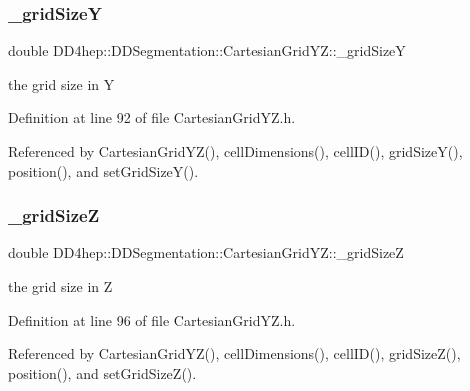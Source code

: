 \subsubsection{\texorpdfstring{\+\_\+grid\+SizeY}{\_gridSizeY}}
{\footnotesize\ttfamily double D\+D4hep\+::\+D\+D\+Segmentation\+::\+Cartesian\+Grid\+Y\+Z\+::\+\_\+grid\+SizeY\hspace{0.3cm}{\ttfamily [protected]}}



the grid size in Y 



Definition at line 92 of file Cartesian\+Grid\+Y\+Z.\+h.



Referenced by Cartesian\+Grid\+Y\+Z(), cell\+Dimensions(), cell\+I\+D(), grid\+Size\+Y(), position(), and set\+Grid\+Size\+Y().

\hypertarget{class_d_d4hep_1_1_d_d_segmentation_1_1_cartesian_grid_y_z_a4584ea29126b00ef60c8a75eeda06028}{}\label{class_d_d4hep_1_1_d_d_segmentation_1_1_cartesian_grid_y_z_a4584ea29126b00ef60c8a75eeda06028} 
\subsubsection{\texorpdfstring{\+\_\+grid\+SizeZ}{\_gridSizeZ}}
{\footnotesize\ttfamily double D\+D4hep\+::\+D\+D\+Segmentation\+::\+Cartesian\+Grid\+Y\+Z\+::\+\_\+grid\+SizeZ\hspace{0.3cm}{\ttfamily [protected]}}



the grid size in Z 



Definition at line 96 of file Cartesian\+Grid\+Y\+Z.\+h.



Referenced by Cartesian\+Grid\+Y\+Z(), cell\+Dimensions(), cell\+I\+D(), grid\+Size\+Z(), position(), and set\+Grid\+Size\+Z().

\hypertarget{class_d_d4hep_1_1_d_d_segmentation_1_1_cartesian_grid_y_z_aeb373831f13b0bf9ca5d534b7551cf50}{}\label{class_d_d4hep_1_1_d_d_segmentation_1_1_cartesian_grid_y_z_aeb373831f13b0bf9ca5d534b7551cf50} 
